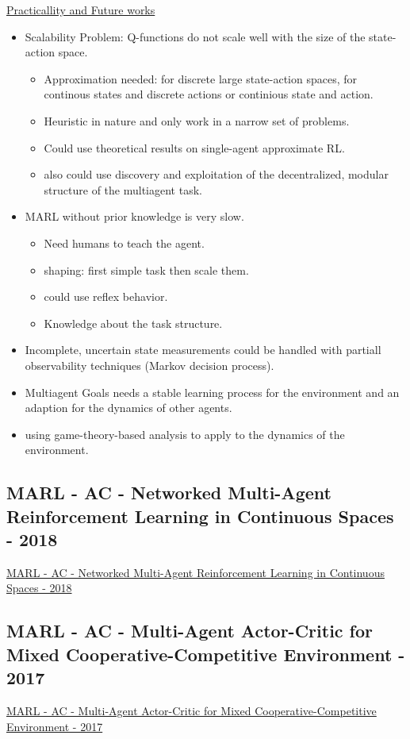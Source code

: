 \underline{Practicallity and Future works}
\begin{itemize}[noitemsep,nolistsep]
	\item Scalability Problem: Q-functions do not scale well with the size of the state-action space.
	\begin{itemize}[noitemsep,nolistsep]
		\item Approximation needed: for discrete large state-action spaces, for continous states and discrete actions or continious state and action.
		\item Heuristic in nature and only work in a narrow set of problems.
		\item Could use theoretical results on single-agent approximate RL.
		\item also could use discovery and exploitation of the decentralized, modular structure of the multiagent task.
	\end{itemize}
	\item MARL without prior knowledge is very slow.
	\begin{itemize}[noitemsep,nolistsep]
		\item Need humans to teach the agent.
		\item shaping: first simple task then scale them.
		\item could use reflex behavior.
		\item Knowledge about the task structure.
	\end{itemize}
	\item Incomplete, uncertain state measurements could be handled with partiall observability techniques (Markov decision process).
	\item Multiagent Goals needs a stable learning process for the environment and an adaption for the dynamics of other agents.
	\item using game-theory-based analysis to apply to the dynamics of the environment.
\end{itemize}

\subsection{MARL - AC - Networked Multi-Agent Reinforcement Learning in Continuous Spaces - 2018}
\href{https://ieeexplore.ieee.org/abstract/document/8619581}{MARL - AC - Networked Multi-Agent Reinforcement Learning in Continuous Spaces - 2018}

\subsection{MARL - AC - Multi-Agent Actor-Critic for Mixed Cooperative-Competitive Environment - 2017}
\href{https://arxiv.org/abs/1706.02275}{MARL - AC - Multi-Agent Actor-Critic for Mixed Cooperative-Competitive Environment - 2017}

